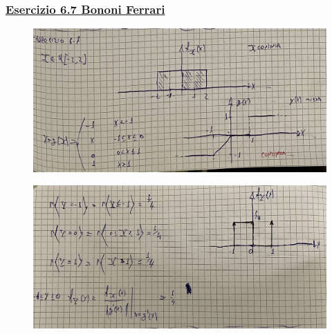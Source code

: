\documentclass{article}
\begin{document}
\subsubsection{\underline{Esercizio 6.7 Bononi Ferrari}}
\begin{figure}[H]
\centering
\includegraphics[scale=0.10]{ese/32.jpeg}
\end{figure}
\begin{figure}[H]
\centering
\includegraphics[scale=0.10]{ese/32a.jpeg}
\end{figure}
\end{document}
